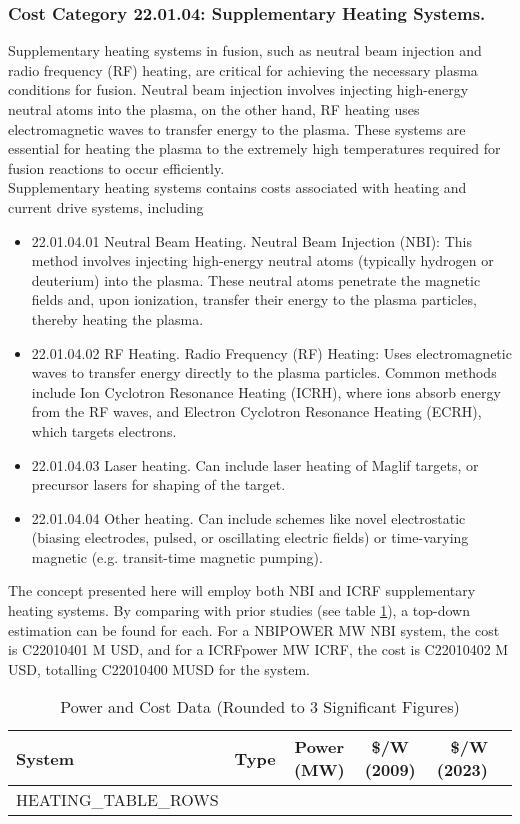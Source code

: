 \subsubsection*{Cost Category 22.01.04: Supplementary Heating Systems.}

Supplementary heating systems in fusion, such as neutral beam injection and radio frequency (RF) heating, are critical for achieving the necessary plasma conditions for fusion. Neutral beam injection involves injecting high-energy neutral atoms into the plasma, on the other hand, RF heating uses electromagnetic waves to transfer energy to the plasma. These systems are essential for heating the plasma to the extremely high temperatures required for fusion reactions to occur efficiently.\\

Supplementary heating systems contains costs associated with heating and current drive systems, including 

\begin{itemize}
    \item 22.01.04.01 Neutral Beam Heating.   Neutral Beam Injection (NBI): This method involves injecting high-energy neutral atoms (typically hydrogen or deuterium) into the plasma. These neutral atoms penetrate the magnetic fields and, upon ionization, transfer their energy to the plasma particles, thereby heating the plasma.
    \item 22.01.04.02 RF Heating.  Radio Frequency (RF) Heating: Uses electromagnetic waves to transfer energy directly to the plasma particles. Common methods include Ion Cyclotron Resonance Heating (ICRH), where ions absorb energy from the RF waves, and Electron Cyclotron Resonance Heating (ECRH), which targets electrons.
    \item 22.01.04.03 Laser heating.  Can include laser heating of Maglif targets, or precursor lasers for shaping of the target.
    \item 22.01.04.04 Other heating.  Can include schemes like novel electrostatic (biasing electrodes, pulsed, or oscillating electric fields) or time-varying magnetic (e.g. transit-time magnetic pumping).
\end{itemize}


The concept presented here will employ both NBI and ICRF supplementary heating systems. By comparing with prior studies (see table \ref{tab:supp_heat}), a top-down estimation can be found for each. For a NBIPOWER MW NBI system, the cost is C22010401 M USD, and for a ICRFpower MW ICRF, the cost is C22010402 M USD, totalling C22010400 MUSD for the system.

\begin{table}[htbp]
    \centering
   
    \begin{tabular}{lcccrr}
        \hline
        System & Type & Power (MW) & \$/W (2009) & \$/W (2023) \\
        \hline
HEATING_TABLE_ROWS
        \hline
    \end{tabular}
     \caption{Power and Cost Data (Rounded to 3 Significant Figures)}
    \label{tab:supp_heat}
\end{table}

